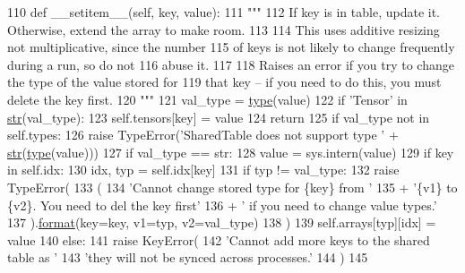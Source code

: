 \begin{DoxyCode}
110     \textcolor{keyword}{def }\_\_setitem\_\_(self, key, value):
111         \textcolor{stringliteral}{"""}
112 \textcolor{stringliteral}{        If key is in table, update it. Otherwise, extend the array to make room.}
113 \textcolor{stringliteral}{}
114 \textcolor{stringliteral}{        This uses additive resizing not multiplicative, since the number}
115 \textcolor{stringliteral}{        of keys is not likely to change frequently during a run, so do not}
116 \textcolor{stringliteral}{        abuse it.}
117 \textcolor{stringliteral}{}
118 \textcolor{stringliteral}{        Raises an error if you try to change the type of the value stored for}
119 \textcolor{stringliteral}{        that key -- if you need to do this, you must delete the key first.}
120 \textcolor{stringliteral}{        """}
121         val\_type = \hyperlink{namespaceparlai_1_1agents_1_1tfidf__retriever_1_1build__tfidf_ad5dfae268e23f506da084a9efb72f619}{type}(value)
122         \textcolor{keywordflow}{if} \textcolor{stringliteral}{'Tensor'} \textcolor{keywordflow}{in} \hyperlink{namespacegenerate__task__READMEs_a5b88452ffb87b78c8c85ececebafc09f}{str}(val\_type):
123             self.tensors[key] = value
124             \textcolor{keywordflow}{return}
125         \textcolor{keywordflow}{if} val\_type \textcolor{keywordflow}{not} \textcolor{keywordflow}{in} self.types:
126             \textcolor{keywordflow}{raise} TypeError(\textcolor{stringliteral}{'SharedTable does not support type '} + \hyperlink{namespacegenerate__task__READMEs_a5b88452ffb87b78c8c85ececebafc09f}{str}(\hyperlink{namespaceparlai_1_1agents_1_1tfidf__retriever_1_1build__tfidf_ad5dfae268e23f506da084a9efb72f619}{type}(value)))
127         \textcolor{keywordflow}{if} val\_type == str:
128             value = sys.intern(value)
129         \textcolor{keywordflow}{if} key \textcolor{keywordflow}{in} self.idx:
130             idx, typ = self.idx[key]
131             \textcolor{keywordflow}{if} typ != val\_type:
132                 \textcolor{keywordflow}{raise} TypeError(
133                     (
134                         \textcolor{stringliteral}{'Cannot change stored type for \{key\} from '}
135                         + \textcolor{stringliteral}{'\{v1\} to \{v2\}. You need to del the key first'}
136                         + \textcolor{stringliteral}{' if you need to change value types.'}
137                     ).\hyperlink{namespaceparlai_1_1chat__service_1_1services_1_1messenger_1_1shared__utils_a32e2e2022b824fbaf80c747160b52a76}{format}(key=key, v1=typ, v2=val\_type)
138                 )
139             self.arrays[typ][idx] = value
140         \textcolor{keywordflow}{else}:
141             \textcolor{keywordflow}{raise} KeyError(
142                 \textcolor{stringliteral}{'Cannot add more keys to the shared table as '}
143                 \textcolor{stringliteral}{'they will not be synced across processes.'}
144             )
145 
\end{DoxyCode}
